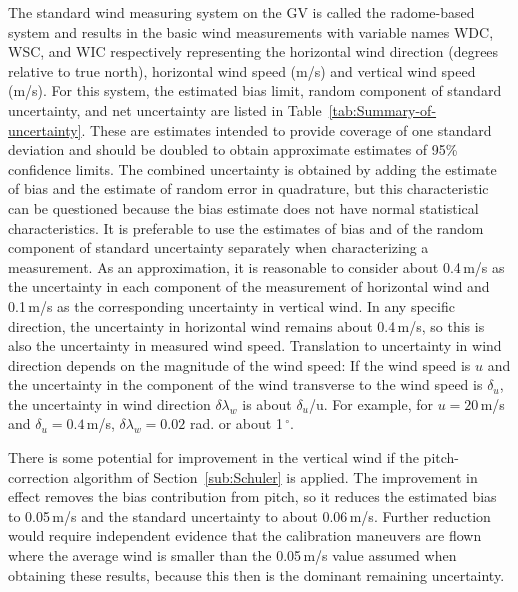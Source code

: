 \documentclass[12pt,twoside,english]{article}\usepackage[]{graphicx}\usepackage[]{color}
\let\OrgIndex\index
\renewcommand*{\index}[1]{\OrgIndex{#1}}
\begin{document}
{{The standard wind measuring system on the GV is called the radome-based system and results in the basic wind measurements with variable names WDC, WSC, and WIC respectively representing the horizontal wind direction (degrees relative to true north), horizontal wind speed (m/s) and vertical wind speed (m/s). For this system, the estimated bias limit, random component of standard uncertainty, and net uncertainty are listed in Table~\ref{tab:Summary-of-uncertainty}. These are estimates intended to provide coverage of one standard deviation and should be doubled to obtain approximate estimates of 95\% confidence limits. The combined uncertainty is obtained by adding the estimate of bias and the estimate of random error in quadrature, but this characteristic can be questioned because the bias estimate does not have normal statistical characteristics. It is preferable to use the estimates of bias and of the random component of standard uncertainty separately when characterizing a measurement. As an approximation, it is reasonable to consider about 0.4\,m/s as the uncertainty in each component of the measurement of horizontal wind and 0.1\,m/s as the corresponding uncertainty in vertical wind. In any specific direction, the uncertainty in horizontal wind remains about 0.4\,m/s, so this is also the uncertainty in measured wind speed. Translation to uncertainty in wind direction depends on the magnitude of the wind speed: If the wind speed is $u$ and the uncertainty in the component of the wind transverse to the wind speed is $\delta_{u}$, the uncertainty in wind direction $\delta\lambda_w$ is about $\delta_{u}$/u. For example, for $u=20$\,m/s and $\delta_{u}=0.4$\,m/s, $\delta\lambda_w=0.02$ rad. or about 1\,$^{\circ}$. 

There is some potential for improvement in the vertical wind if the pitch-correction algorithm of Section{~}\ref{sub:Schuler} is applied. The improvement in effect removes the bias contribution from pitch, so it reduces the estimated bias to 0.05\,m/s and the standard uncertainty to about 0.06\,m/s. Further reduction would require independent evidence that the calibration maneuvers are flown where the average wind is smaller than the 0.05\,m/s value assumed when obtaining these results, because this then is the dominant remaining uncertainty. 

}}
\end{document}
